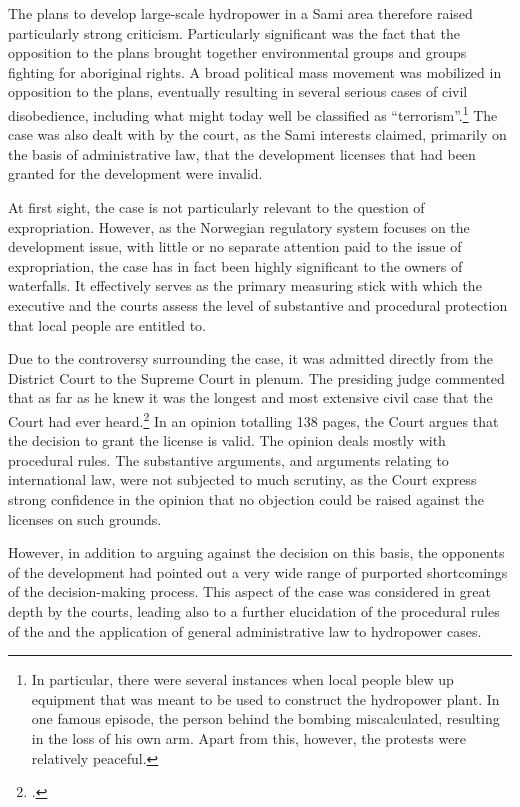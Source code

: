 The plans to develop large-scale hydropower in a Sami area therefore raised particularly strong criticism. Particularly significant was the fact that the opposition to the plans brought together environmental groups and groups fighting for aboriginal rights. A broad political mass movement was mobilized in opposition to the plans, eventually resulting in several serious cases of civil disobedience, including what might today well be classified as ``terrorism''.\footnote{In particular, there were several instances when local people blew up equipment that was meant to be used to construct the hydropower plant. In one famous episode, the person behind the bombing miscalculated, resulting in the loss of his own arm. Apart from this, however, the protests were relatively peaceful.}
The case was also dealt with by the court, as the Sami interests claimed, primarily on the basis of administrative law, that the development licenses that had been granted for the development were invalid. 

At first sight, the case is not particularly relevant to the question of expropriation. However, as the Norwegian regulatory system focuses on the development issue, with little or no separate attention paid to the issue of expropriation, the case has in fact been highly significant to the owners of waterfalls. It effectively serves as the primary measuring stick with which the executive and the courts assess the level of substantive and procedural protection that local people are entitled to.

Due to the controversy surrounding the case, it was admitted directly from the District Court to the Supreme Court in plenum. The presiding judge commented that as far as he knew it was the longest and most extensive civil case that the Court had ever heard.\footcite[254]{alta82} In an opinion totalling 138 pages, the Court argues that the decision to grant the license is valid. The opinion deals mostly with procedural rules. The substantive arguments, and arguments relating to international law, were not subjected to much scrutiny, as the Court express strong confidence in the opinion that no objection could be raised against the licenses on such grounds. 

However, in addition to arguing against the decision on this basis, the opponents of the development had pointed out a very wide range of purported shortcomings of the decision-making process. This aspect of the case was considered in great depth by the courts, leading also to a further elucidation of the procedural rules of the \cite{wra17} and the application of general administrative law to hydropower cases.

